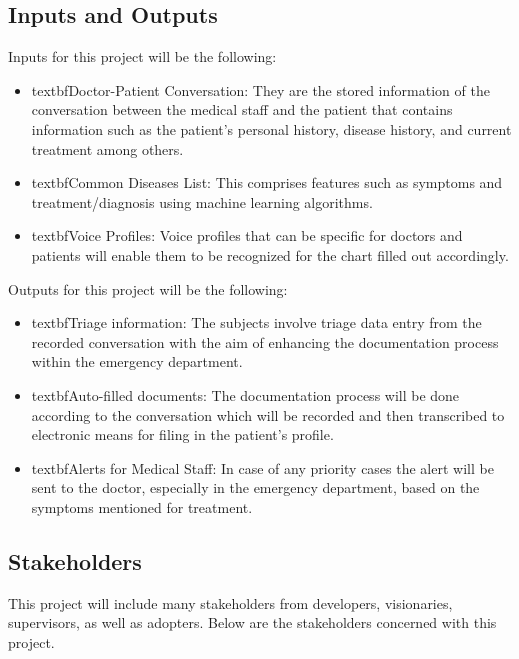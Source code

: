 \documentclass{article}
\begin{document}
\subsection{Inputs and Outputs}
Inputs for this project will be the following:

\begin{itemize}
    \item textbf{Doctor-Patient Conversation}: They are the stored information of the conversation between the medical staff and the patient that contains information such as the patient’s personal history, disease history, and current treatment among others.
    \item textbf{Common Diseases List}: This comprises features such as symptoms and treatment/diagnosis using machine learning algorithms.
    \item textbf{Voice Profiles}: Voice profiles that can be specific for doctors and patients will enable them to be recognized for the chart filled out accordingly. 
\end {itemize}

Outputs for this project will be the following: 

\begin{itemize} 
    \item textbf{Triage information}: The subjects involve triage data entry from the recorded conversation with the aim of enhancing the documentation process within the emergency department.
    \item textbf{Auto-filled documents}: The documentation process will be done according to the conversation which will be recorded and then transcribed to electronic means for filing in the patient’s profile.
    \item textbf{Alerts for Medical Staff}: In case of any priority cases the alert will be sent to the doctor, especially in the emergency department, based on the symptoms mentioned for treatment.
\end{itemize}

\subsection{Stakeholders}

This project will include many stakeholders from developers, visionaries, supervisors, as well as adopters. Below are the stakeholders concerned with this project.
\end{document}
